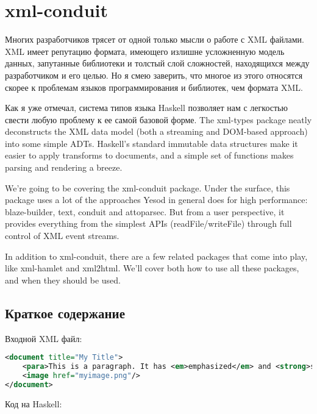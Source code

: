 \chapter{xml-conduit}

Многих разработчиков трясет от одной только мысли о работе с XML файлами. XML имеет репутацию формата, имеющего излишне усложненную модель данных, запутанные библиотеки и толстый слой сложностей, находящихся между разработчиком и его целью. Но я смею заверить, что многое из этого относятся скорее к проблемам языков программирования и библиотек, чем формата XML.

Как я уже отмечал, система типов языка Haskell позволяет нам с легкостью свести любую проблему к ее самой базовой форме. The xml-types package neatly deconstructs the XML data model (both a streaming and DOM-based approach) into some simple ADTs. Haskell's standard immutable data structures make it easier to apply transforms to documents, and a simple set of functions makes parsing and rendering a breeze.

We're going to be covering the xml-conduit package. Under the surface, this package uses a lot of the approaches Yesod in general does for high performance: blaze-builder, text, conduit and attoparsec. But from a user perspective, it provides everything from the simplest APIs (readFile/writeFile) through full control of XML event streams.

In addition to xml-conduit, there are a few related packages that come into play, like xml-hamlet and xml2html. We'll cover both how to use all these packages, and when they should be used.

\section{Краткое содержание} %

Входной XML файл:

\begin{lstlisting}[language=XML]
<document title="My Title">
    <para>This is a paragraph. It has <em>emphasized</em> and <strong>strong</strong> words.</para>
    <image href="myimage.png"/>
</document>
\end{lstlisting}

Код на Haskell:

